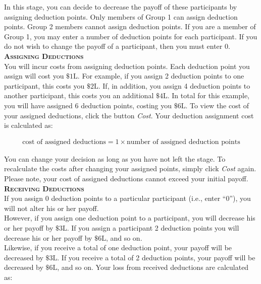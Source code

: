 \documentclass[12pt]{article}
\begin{document}
In this stage, you can decide to decrease the payoff of these participants by assigning deduction points. Only members of Group 1 can assign deduction points.  Group 2 members cannot assign deduction points. 
If you are a member of Group 1, you may enter a number of deduction points for each participant. If you do not wish to change the payoff of a participant, then you must enter 0.\\ 

{\bf \scshape Assigning Deductions}\\

You will incur costs from assigning deduction points. Each deduction point you assign will cost you $\$1\text{L}$. For example, if you assign 2 deduction points to one participant, this costs you $\$2\text{L}$. If, in addition, you assign 4 deduction points to another participant, this costs you an additional $\$4\text{L}$. In total for this example, you will have assigned 6 deduction points, costing you $\$6\text{L}$.  To view the cost of your assigned deductions, click the button {\em Cost}. Your deduction assignment cost is calculated as: 

\begin{align*}
\text{cost of assigned deductions} = 1 \times \text{number of assigned deduction points}
\end{align*}

You can change your decision as long as you have not left the stage. To recalculate the costs after changing your assigned points, simply click {\em Cost} again.\\

Please note, your cost of assigned deductions cannot exceed your initial payoff.\\

{\bf \scshape Receiving Deductions}\\

If you assign 0 deduction points to a particular participant (i.e., enter ``0''), you will not alter his or her payoff.\\

However, if you assign one deduction point to a participant, you will decrease his or her payoff by $\$3\text{L}$. If you assign a participant 2 deduction points you will decrease his or her payoff by $\$6\text{L}$, and so on.\\ 

Likewise, if you receive a total of one deduction point, your payoff will be decreased by $\$3\text{L}$. If you receive a total of 2 deduction points, your payoff will be decreased by $\$6\text{L}$, and so on. Your loss from received deductions are calculated as:
\end{document}
